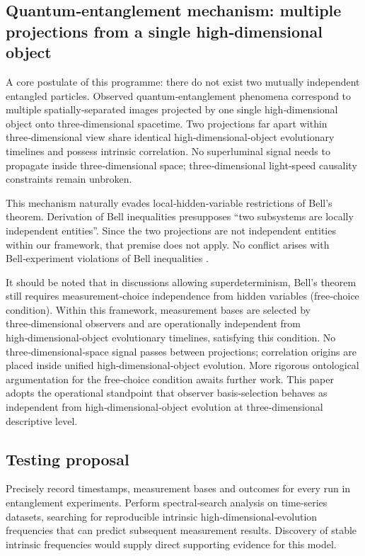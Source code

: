 \documentclass[12pt,a4paper]{article}
\begin{document}
\subsection{Quantum‑entanglement mechanism: multiple projections from a single high‑dimensional object}
A core postulate of this programme: there do not exist two mutually independent entangled particles. Observed quantum‑entanglement phenomena correspond to multiple spatially‑separated images projected by one single high‑dimensional object onto three‑dimensional spacetime. Two projections far apart within three‑dimensional view share identical high‑dimensional‑object evolutionary timelines and possess intrinsic correlation. No superluminal signal needs to propagate inside three‑dimensional space; three‑dimensional light‑speed causality constraints remain unbroken.

This mechanism naturally evades local‑hidden‑variable restrictions of Bell’s theorem. Derivation of Bell inequalities presupposes ``two subsystems are locally independent entities''. Since the two projections are not independent entities within our framework, that premise does not apply. No conflict arises with Bell‑experiment violations of Bell inequalities \cite{bell1964,aspect1982}.

It should be noted that in discussions allowing superdeterminism, Bell’s theorem still requires measurement‑choice independence from hidden variables (free‑choice condition). Within this framework, measurement bases are selected by three‑dimensional observers and are operationally independent from high‑dimensional‑object evolutionary timelines, satisfying this condition. No three‑dimensional‑space signal passes between projections; correlation origins are placed inside unified high‑dimensional‑object evolution. More rigorous ontological argumentation for the free‑choice condition awaits further work. This paper adopts the operational standpoint that observer basis‑selection behaves as independent from high‑dimensional‑object evolution at three‑dimensional descriptive level.

\subsection{Testing proposal}
Precisely record timestamps, measurement bases and outcomes for every run in entanglement experiments. Perform spectral‑search analysis on time‑series datasets, searching for reproducible intrinsic high‑dimensional‑evolution frequencies that can predict subsequent measurement results. Discovery of stable intrinsic frequencies would supply direct supporting evidence for this model.
\end{document}
